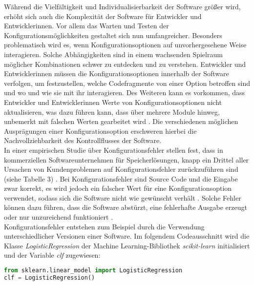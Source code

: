 \documentclass[german,bachelor]{swsLeipzig}
\begin{document}
W\"ahrend die Vielf\"altigkeit und Individualisierbarkeit der Software gr\"o\ss er wird, erh\"oht sich auch die Komplexit\"at der Software f\"ur Entwickler und Entwicklerinnen.
Vor allem das Warten und Testen der Konfigurationsmöglichkeiten gestaltet sich nun umfangreicher.
Besonders problematisch wird es, wenn Konfigurationsoptionen auf unvorhergesehene Weise interagieren.
Solche Abh\"angigkeiten sind in einem wachsenden Spielraum m\"oglicher Kombinationen schwer zu entdecken und zu verstehen.
Entwickler und Entwicklerinnen m\"ussen die Konfigurationsoptionen innerhalb der Software verfolgen, um festzustellen,
welche Codefragmente von einer Option betroffen sind und wo und wie sie mit ihr interagieren.
Des Weiteren kann es vorkommen, dass Entwickler und Entwicklerinnen Werte von Konfigurationsoptionen nicht aktualisieren, was dazu führen kann,
dass über mehrere Module hinweg, unbemerkt mit falschen Werten gearbeitet wird \cite[]{7774519}.
Die verschiedenen m\"oglichen Auspr\"agungen einer Konfigurationsoption erschweren hierbei die Nachvollziehbarkeit des Kontrollflusses der Software.\\

In einer empirischen Studie über Konfigurationsfehler stellen \citeauthor{10.1145/2043556.2043572} fest,
dass in kommerziellen Softwareunternehmen für Speicherlösungen, knapp ein Drittel aller Ursachen von Kundenproblemen auf Konfigurationsfehler zurückzuführen sind (siehe Tabelle 3) \cite[]{10.1145/2043556.2043572}.
Bei Konfigurationsfehler sind Source Code und die Eingabe zwar korrekt, es wird jedoch ein falscher Wert für eine Konfigurationsoption verwendet,
sodass sich die Software nicht wie gewünscht verhält \cite[]{10.1145/2568225.2568251}.
Solche Fehler können dazu führen, dass die Software abstürzt, eine fehlerhafte Ausgabe erzeugt oder nur unzureichend funktioniert \cite[]{10.1145/2568225.2568251}.\\

Konfigurationsfehler entstehen zum Beispiel durch die Verwendung unterschiedlicher Versionen einer Software.
Im folgendem Codeausschnitt wird die Klasse \textit{LogisticRegression} der Machine Learning-Bibliothek \textit{scikit-learn} initialisiert und der Variable \textit{clf} zugewiesen:\\

\begin{lstlisting}[language=Python, frame=single, basicstyle=\small]
from sklearn.linear_model import LogisticRegression
clf = LogisticRegression()
\end{lstlisting}
\
\end{document}
